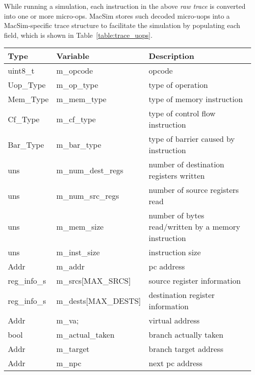 While running a simulation, each instruction in the above \emph{raw trace} is converted 
into one or more micro-ops. MacSim stores such decoded micro-uops into a MacSim-specific
trace structure to facilitate the simulation by populating each field, which is shown 
in Table~\ref{table:trace_uops}.

\begin{table*}[htb]
\begin{footnotesize}
\begin{center}
\caption{MacSim-specific data structure for micro-ops.}
\label{table:trace_uops}
\begin{tabular}{|l|l|l|} 
\hline
Type      & Variable                 & Description \\ \hline 
uint8\_t  & m\_opcode                & opcode \\ \hline
Uop\_Type & m\_op\_type              & type of operation \\ \hline
Mem\_Type & m\_mem\_type             & type of memory instruction \\ \hline
Cf\_Type  & m\_cf\_type              & type of control flow instruction \\ \hline
Bar\_Type & m\_bar\_type             & type of barrier caused by instruction \\ \hline
uns       &   m\_num\_dest\_regs     & number of destination registers written \\ \hline
uns       &   m\_num\_src\_regs      & number of source registers read \\ \hline
uns       &   m\_mem\_size           & number of bytes read/written by a memory instruction \\ \hline
uns       &   m\_inst\_size          & instruction size \\ \hline
Addr      &   m\_addr                & pc address  \\ \hline
reg\_info\_s&   m\_srcs[MAX\_SRCS]   & source register information \\ \hline
reg\_info\_s&   m\_dests[MAX\_DESTS] & destination register information \\ \hline
Addr      &   m\_va;                 & virtual address \\ \hline
bool      &   m\_actual\_taken       & branch actually taken \\ \hline
Addr      &   m\_target              & branch target address \\ \hline
Addr      &   m\_npc                 & next pc address  \\ \hline

\end{tabular}
\end{center}
\end{footnotesize}
\end{table*}
